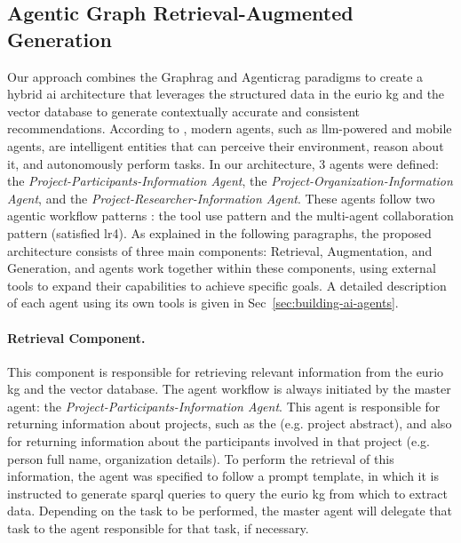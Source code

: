 \subsection*{Agentic Graph Retrieval-Augmented Generation}
Our approach combines the Graph\gls{rag} and Agentic\gls{rag} paradigms to create a hybrid \gls{ai} architecture that leverages the structured data in the \gls{eurio} \gls{kg} and the vector database to generate contextually accurate and consistent recommendations.
According to \cite{singh2025}, modern agents, such as \gls{llm}-powered and mobile agents, are intelligent entities that can perceive their environment, reason about it, and autonomously perform tasks.
In our architecture, 3 agents were defined: the \textit{Project-Participants-Information Agent}, the \textit{Project-Organization-Information Agent}, and the \textit{Project-Researcher-Information Agent}.
These agents follow two agentic workflow patterns \cite{singh2025}: the tool use pattern and the multi-agent collaboration pattern (satisfied \gls{lr}4).
As explained in the following paragraphs, the proposed architecture consists of three main components: Retrieval, Augmentation, and Generation, and agents work together within these components, using external tools to expand their capabilities to achieve specific goals.
A detailed description of each agent using its own tools is given in Sec~\ref{sec:building-ai-agents}.

\paragraph*{Retrieval Component.}
This component is responsible for retrieving relevant information from the \gls{eurio} \gls{kg} and the vector database.
The agent workflow is always initiated by the master agent: the \textit{Project-Participants-Information Agent}.
This agent is responsible for returning information about projects, such as the (e.g. project abstract), and also for returning information about the participants involved in that project (e.g. person full name, organization details).
To perform the retrieval of this information, the agent was specified to follow a prompt template, in which it is instructed to generate \gls{sparql} queries to query the \gls{eurio} \gls{kg} from which to extract data.
Depending on the task to be performed, the master agent will delegate that task to the agent responsible for that task, if necessary.

